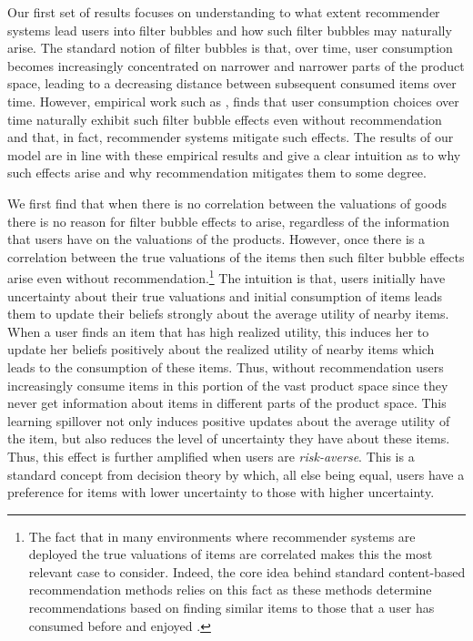\documentclass[format=acmsmall, review=false]{acmart}
\newcommand{\xhdr}[1]{\vspace{1mm} \noindent{\bf #1}}
\begin{document}
\xhdr{Main Findings}
Our first set of results focuses on understanding to what extent recommender systems lead users into filter bubbles and how such filter bubbles may naturally arise. The standard notion of filter bubbles is that, over time, user consumption becomes increasingly concentrated on narrower and narrower parts of the product space, leading to a decreasing distance between subsequent consumed items over time. However, empirical work such as \cite{nguyen2014exploring}, finds that user consumption choices over time naturally exhibit such filter bubble effects even without recommendation and that, in fact, recommender systems mitigate such effects. The results of our model are in line with these empirical results and give a clear intuition as to why such effects arise and why recommendation mitigates them to some degree.
\par
We first find that when there is no correlation between the valuations of goods there is no reason for filter bubble effects to arise, regardless of the information that users have on the valuations of the products. However, once there is a correlation between the true valuations of the items then such filter bubble effects arise even without recommendation.\footnote{The fact that in many environments where recommender systems are deployed the true valuations of items are correlated makes this the most relevant case to consider. Indeed, the core idea behind standard content-based recommendation methods relies on this fact as these methods determine recommendations based on finding similar items to those that a user has consumed before and enjoyed \citep{adomavicius2005toward}.} The intuition is that, users initially have uncertainty about their true valuations and initial consumption of items leads them to update their beliefs strongly about the average utility of nearby items. When a user finds an item that has high realized utility, this induces her to update her beliefs positively about the realized utility of nearby items which leads to  the consumption of these items. Thus, without recommendation users increasingly consume items in this portion of the vast product space since they never get information about items in different parts of the product space. This learning spillover not only induces positive updates about the average utility of the item, but also reduces the level of uncertainty they have about these items. Thus, this effect is further amplified when users are \textit{risk-averse}. This is a standard concept from decision theory by which, all else being equal, users have a preference for items with lower uncertainty to those with higher uncertainty.
\end{document}
